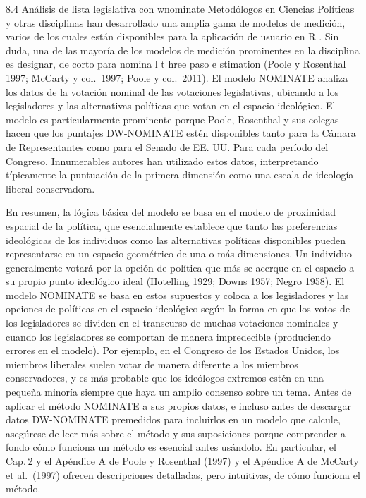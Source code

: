 \documentclass[
]{book}
\begin{document}
8.4 Análisis de lista legislativa con wnominate
Metodólogos en Ciencias Políticas y otras disciplinas han desarrollado una amplia gama de modelos de medición, varios de los cuales están disponibles para la aplicación de usuario en R . Sin duda, una de las mayoría de los modelos de medición prominentes en la disciplina es designar, de corto para nomina l t hree paso e stimation (Poole y Rosenthal 1997; McCarty y col.~1997; Poole y col.~2011). El modelo NOMINATE analiza los datos de la votación nominal de las votaciones legislativas, ubicando a los legisladores y las alternativas políticas que votan en el espacio ideológico. El modelo es particularmente prominente porque Poole, Rosenthal y sus colegas hacen que los puntajes DW-NOMINATE estén disponibles tanto para la Cámara de Representantes como para el Senado de EE. UU. Para cada período del Congreso. Innumerables autores han utilizado estos datos, interpretando típicamente la puntuación de la primera dimensión como una escala de ideología liberal-conservadora.

En resumen, la lógica básica del modelo se basa en el modelo de proximidad espacial de la política, que esencialmente establece que tanto las preferencias ideológicas de los individuos como las alternativas políticas disponibles pueden representarse en un espacio geométrico de una o más dimensiones. Un individuo generalmente votará por la opción de política que más se acerque en el espacio a su propio punto ideológico ideal (Hotelling 1929; Downs 1957; Negro 1958). El modelo NOMINATE se basa en estos supuestos y coloca a los legisladores y las opciones de políticas en el espacio ideológico según la forma en que los votos de los legisladores se dividen en el transcurso de muchas votaciones nominales y cuando los legisladores se comportan de manera impredecible (produciendo errores en el modelo). Por ejemplo, en el Congreso de los Estados Unidos, los miembros liberales suelen votar de manera diferente a los miembros conservadores, y es más probable que los ideólogos extremos estén en una pequeña minoría siempre que haya un amplio consenso sobre un tema. Antes de aplicar el método NOMINATE a sus propios datos, e incluso antes de descargar datos DW-NOMINATE premedidos para incluirlos en un modelo que calcule, asegúrese de leer más sobre el método y sus suposiciones porque comprender a fondo cómo funciona un método es esencial antes usándolo. En particular, el Cap. 2 y el Apéndice A de Poole y Rosenthal (1997) y el Apéndice A de McCarty et al.~(1997) ofrecen descripciones detalladas, pero intuitivas, de cómo funciona el método.
\end{document}
